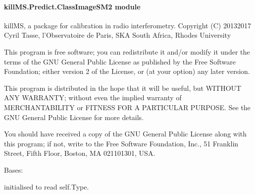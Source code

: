\documentclass[letterpaper,10pt,english]{sphinxmanual}
\begin{document}
\paragraph{killMS.Predict.ClassImageSM2 module}
\label{\detokenize{api/killMS.Predict:module-killMS.Predict.ClassImageSM2}}\label{\detokenize{api/killMS.Predict:killms-predict-classimagesm2-module}}
\sphinxAtStartPar
killMS, a package for calibration in radio interferometry.
Copyright (C) 2013\sphinxhyphen{}2017  Cyril Tasse, l’Observatoire de Paris,
SKA South Africa, Rhodes University

\sphinxAtStartPar
This program is free software; you can redistribute it and/or
modify it under the terms of the GNU General Public License
as published by the Free Software Foundation; either version 2
of the License, or (at your option) any later version.

\sphinxAtStartPar
This program is distributed in the hope that it will be useful,
but WITHOUT ANY WARRANTY; without even the implied warranty of
MERCHANTABILITY or FITNESS FOR A PARTICULAR PURPOSE.  See the
GNU General Public License for more details.

\sphinxAtStartPar
You should have received a copy of the GNU General Public License
along with this program; if not, write to the Free Software
Foundation, Inc., 51 Franklin Street, Fifth Floor, Boston, MA  02110\sphinxhyphen{}1301, USA.

\begin{fulllineitems}
\label{\detokenize{api/killMS.Predict:killMS.Predict.ClassImageSM2.ClassImageSM}}
\pysigstartsignatures
{}
\pysigstopsignatures
\sphinxAtStartPar
Bases: 

\sphinxAtStartPar
initialised to read self.Type.

\end{fulllineitems}

\end{document}
